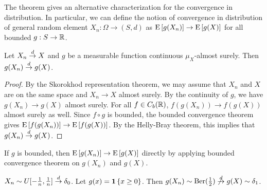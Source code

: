 \begin{remark}
    The theorem gives an alternative characterization for 
    the convergence in distribution. In particular, we can define 
    the notion of convergence in distribution of general random 
    element $X_n:\Omega\to (S,d)$ as $\operatorname{E}\left[ {g(X_n)} \right]\to \operatorname{E}\left[ {g(X)} \right]$ 
    for all bounded $g:S\to\mathbb{R}$.  
\end{remark}

\begin{theorem}
    Let $X_n\overset{d}{\to} X$ and $g$ be a measurable function continuous 
    $\mu_X$-almost surely. Then $g(X_n)\overset{d}{\to} g(X)$. 
\end{theorem}
\begin{proof}
    By the Skorokhod representation theorem, we may assume that $X_n$ and 
    $X$ are on the same space and $X_n\to X$ almost surely. By the continuity 
    of $g$, we have $g(X_n)\to g(X)$ almost surely. For all $f\in C_b(\mathbb{R})$, 
    $f(g(X_n))\to f(g(X))$ almost surely as well. Since $f\circ g$ is bounded, 
    the bounded convergence theorem gives $\operatorname{E}\left[ {f(g(X_n))} \right]\to \operatorname{E}\left[ {f(g(X))} \right]$. 
    By the Helly-Bray theorem, this implies that $g(X_n)\overset{d}{\to} g(X)$.  
\end{proof}
\begin{remark}
    If $g$ is bounded, then $\operatorname{E}\left[ {g(X_n)} \right]\to\operatorname{E}\left[ {g(X)} \right]$ directly by 
    applying bounded convergence theorem on $g(X_n)$ and $g(X)$.  
\end{remark}

\begin{example}
    $X_n\sim U[-\frac{1}{n},\frac{1}{n}]\overset{d}{\to} \delta_0$. Let $g(x) = \mathbf{1}\left\{ {x\geq 0} \right\}$. 
    Then $g(X_n)\sim\text{Ber}(\frac{1}{2})\not\overset{d}{\to} g(X)\sim \delta_1$. 
\end{example}